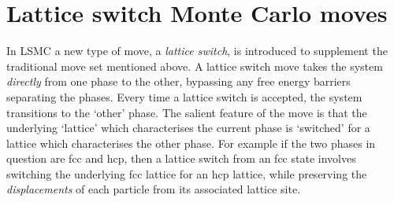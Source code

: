 \documentclass{report}
\begin{document}
\section{Lattice switch Monte Carlo moves}\label{sec:lattice_switch}
In LSMC a new type of move, a \emph{lattice switch}, is introduced to supplement the traditional move set mentioned above. A lattice switch move takes
the system \emph{directly} from one phase to the other, bypassing any free energy barriers separating the phases. Every time a lattice switch is accepted, 
the system transitions to the `other' phase. The salient feature of the move is that the underlying `lattice' which characterises the current phase is 
`switched' for a lattice which characterises the other phase. For example if the two phases in question are fcc and hcp, then a lattice switch from an
fcc state involves switching the underlying fcc lattice for an hcp lattice, while preserving the \emph{displacements} of each particle from its associated
lattice site. 
\end{document}

